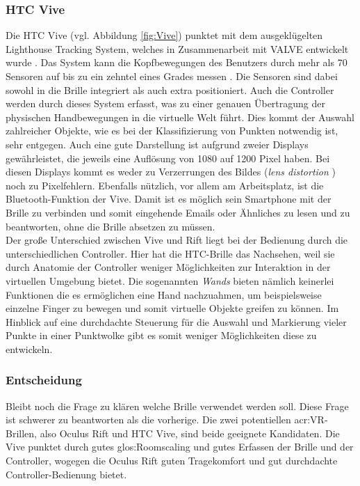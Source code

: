 \subsubsection{HTC Vive}
Die HTC Vive (vgl. Abbildung \ref{fig:Vive}) punktet mit dem ausgeklügelten Lighthouse Tracking System, welches in Zusammenarbeit mit VALVE entwickelt wurde \cite{bib:Lighthouse}. Das System kann die Kopfbewegungen des Benutzers durch mehr als 70 Sensoren auf bis zu ein zehntel eines Grades messen \cite{bib:ViveTest}. Die Sensoren sind dabei sowohl in die Brille integriert als auch extra positioniert. Auch die Controller werden durch dieses System erfasst, was zu einer genauen Übertragung der physischen Handbewegungen in die virtuelle Welt führt. Dies kommt der Auswahl zahlreicher Objekte, wie es bei der Klassifizierung von Punkten notwendig ist, sehr entgegen. Auch eine gute Darstellung ist aufgrund zweier Displays gewährleistet, die jeweils eine Auflösung von 1080 auf 1200 Pixel haben. Bei diesen Displays kommt es weder zu Verzerrungen des Bildes (\textit{\glqq lens distortion\grqq} \cite{bib:ViveTest}) noch zu Pixelfehlern. Ebenfalls nützlich, vor allem am Arbeitsplatz, ist die Bluetooth-Funktion der Vive. Damit ist es möglich sein Smartphone mit der Brille zu verbinden und somit eingehende Emails oder Ähnliches zu lesen und zu beantworten, ohne die Brille absetzen zu müssen.\\  

Der große Unterschied zwischen Vive und Rift liegt bei der Bedienung durch die unterschiedlichen Controller. Hier hat die HTC-Brille das Nachsehen, weil sie durch Anatomie der Controller weniger Möglichkeiten zur Interaktion in der virtuellen Umgebung bietet. Die sogenannten \textit{Wands} bieten nämlich keinerlei Funktionen die es ermöglichen eine Hand nachzuahmen, um beispielsweise einzelne Finger zu bewegen und somit virtuelle Objekte greifen zu können. Im Hinblick auf eine durchdachte Steuerung für die Auswahl und Markierung vieler Punkte in einer Punktwolke gibt es somit weniger Möglichkeiten diese zu entwickeln.

\subsubsection{Entscheidung}
Bleibt noch die Frage zu klären welche Brille verwendet werden soll. Diese Frage ist schwerer zu beantworten als die vorherige. Die zwei potentiellen \acrshort{acr:VR}-Brillen, also Oculus Rift und HTC Vive, sind beide geeignete Kandidaten. Die Vive punktet durch gutes \gls{glos:Roomscaling} und gutes Erfassen der Brille und der Controller, wogegen die Oculus Rift guten Tragekomfort und gut durchdachte Controller-Bedienung bietet. 

